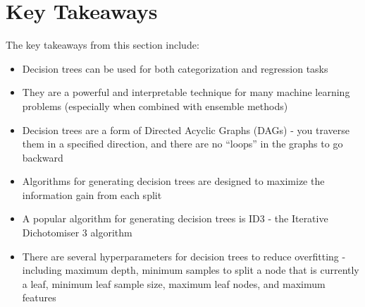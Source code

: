 \documentclass[11pt]{article}
\providecommand{\tightlist}{%
      \setlength{\itemsep}{0pt}\setlength{\parskip}{0pt}}
\begin{document}
    \hypertarget{key-takeaways}{%
\section{Key Takeaways}\label{key-takeaways}}

The key takeaways from this section include:

\begin{itemize}
\tightlist
\item
  Decision trees can be used for both categorization and regression
  tasks
\item
  They are a powerful and interpretable technique for many machine
  learning problems (especially when combined with ensemble methods)
\item
  Decision trees are a form of Directed Acyclic Graphs (DAGs) - you
  traverse them in a specified direction, and there are no ``loops'' in
  the graphs to go backward
\item
  Algorithms for generating decision trees are designed to maximize the
  information gain from each split
\item
  A popular algorithm for generating decision trees is ID3 - the
  Iterative Dichotomiser 3 algorithm
\item
  There are several hyperparameters for decision trees to reduce
  overfitting - including maximum depth, minimum samples to split a node
  that is currently a leaf, minimum leaf sample size, maximum leaf
  nodes, and maximum features
\end{itemize}


    
    
    
\end{document}
